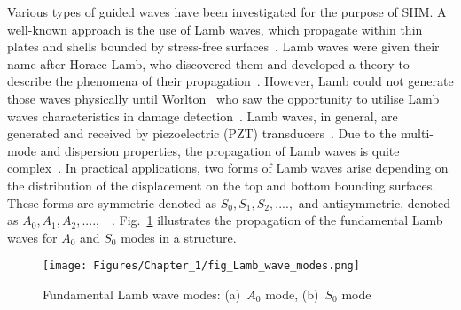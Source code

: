 Various types of guided waves have been investigated for the purpose of SHM. 
A well-known approach is the use of Lamb waves, which propagate within thin plates and shells bounded by stress-free surfaces~\cite{Mitra2016}.
Lamb waves were given their name after Horace Lamb, who discovered them and developed a theory to describe the phenomena of their propagation~\cite{Ostachowicz2012}. 
However, Lamb could not generate those waves physically until Worlton~\cite{Worlton1961} who saw the opportunity to utilise Lamb waves 
characteristics in damage detection~\cite{Ostachowicz2012}.
Lamb waves, in general, are generated and received by piezoelectric (PZT) 
transducers~\cite{Cai2012}.
Due to the multi-mode and dispersion properties, the propagation of Lamb waves 
is quite complex~\cite{Ostachowicz2012}. 
In practical applications, two forms of Lamb waves arise depending on the distribution of the displacement on the top and bottom bounding surfaces.
These forms are symmetric denoted as \(S_0, S_1, S_2,...., \) and antisymmetric, denoted as 
\(A_0,A_1,A_2,....,\) ~\cite{Ostachowicz2012}. 
Fig.~\ref{fig:LambModes} illustrates the propagation of the fundamental Lamb waves for \(A_0\) and \(S_0\) modes in a structure.
\begin{figure}[!ht]
	\begin{center}
		\centering
		\texttt{[image: Figures/Chapter\_1/fig\_Lamb\_wave\_modes.png]}
	\end{center}
	\caption{Fundamental Lamb wave modes: (a)~\(A_0\) mode, (b)~\( S_0\) mode} 
	\label{fig:LambModes}
\end{figure} 
